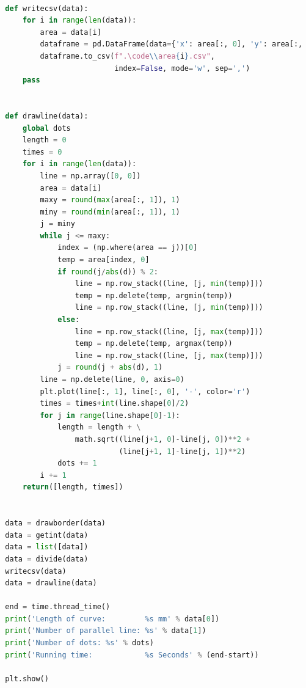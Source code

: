 \documentclass{apmcmthesis}
\begin{document}
\begin{lstlisting}[language=Python,caption={The python Source code of contour parallel hatch}]
  
  def writecsv(data):
      for i in range(len(data)):
          area = data[i]
          dataframe = pd.DataFrame(data={'x': area[:, 0], 'y': area[:, 1]})
          dataframe.to_csv(f".\code\\area{i}.csv",
                           index=False, mode='w', sep=',')
      pass
  
  
  def drawline(data):   
      global dots
      length = 0   
      times = 0   
      for i in range(len(data)):
          line = np.array([0, 0])
          area = data[i]
          maxy = round(max(area[:, 1]), 1)
          miny = round(min(area[:, 1]), 1)
          j = miny
          while j <= maxy:
              index = (np.where(area == j))[0]
              temp = area[index, 0]
              if round(j/abs(d)) % 2:
                  line = np.row_stack((line, [j, min(temp)]))
                  temp = np.delete(temp, argmin(temp))
                  line = np.row_stack((line, [j, min(temp)]))
              else:
                  line = np.row_stack((line, [j, max(temp)]))
                  temp = np.delete(temp, argmax(temp))
                  line = np.row_stack((line, [j, max(temp)]))
              j = round(j + abs(d), 1)
          line = np.delete(line, 0, axis=0)
          plt.plot(line[:, 1], line[:, 0], '-', color='r')
          times = times+int(line.shape[0]/2)
          for j in range(line.shape[0]-1):
              length = length + \
                  math.sqrt((line[j+1, 0]-line[j, 0])**2 +
                            (line[j+1, 1]-line[j, 1])**2)
              dots += 1
          i += 1
      return([length, times])
  
  
  data = drawborder(data)
  data = getint(data)
  data = list([data])
  data = divide(data)
  writecsv(data)
  data = drawline(data)
  
  end = time.thread_time()
  print('Length of curve:         %s mm' % data[0])
  print('Number of parallel line: %s' % data[1])
  print('Number of dots: %s' % dots)
  print('Running time:            %s Seconds' % (end-start))
  
  plt.show()
  
\end{lstlisting}
\end{document}
